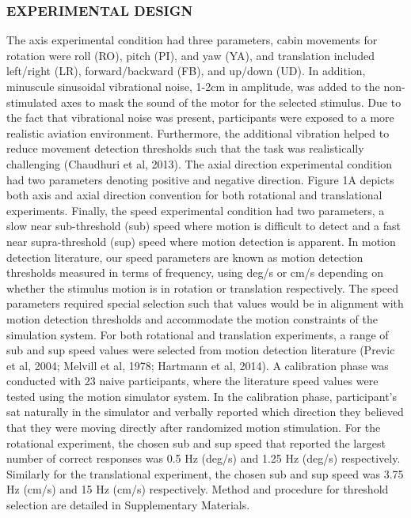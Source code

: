 \documentclass[11pt, onecolumn]{article}
\begin{document}
\subsubsection{EXPERIMENTAL DESIGN}
The axis experimental condition had three parameters, cabin movements for rotation were roll (RO), pitch (PI), and yaw (YA), and translation included left/right (LR), forward/backward (FB), and up/down (UD).  In addition, minuscule sinusoidal vibrational noise, 1-2cm in amplitude, was added to the non-stimulated axes to mask the sound of the motor for the selected stimulus.  Due to the fact that vibrational noise was present, participants were exposed to a more realistic aviation environment.  Furthermore, the additional vibration helped to reduce movement detection thresholds such that the task was realistically challenging (Chaudhuri et al, 2013).  The axial direction experimental condition had two parameters denoting positive and negative direction.  Figure 1A depicts both axis and axial direction convention for both rotational and translational experiments.  Finally, the speed experimental condition had two parameters, a slow near sub-threshold (sub) speed where motion is difficult to detect and a fast near supra-threshold (sup) speed where motion detection is apparent.  In motion detection literature, our speed parameters are known as motion detection thresholds measured in terms of frequency, using deg/s or cm/s depending on whether the stimulus motion is in rotation or translation respectively.  The speed parameters required special selection such that values would be in alignment with motion detection thresholds and accommodate the motion constraints of the simulation system.  For both rotational and translation experiments, a range of sub and sup speed values were selected from motion detection literature (Previc et al, 2004; Melvill et al, 1978; Hartmann et al, 2014).  A calibration phase was conducted with 23 naive participants, where the literature speed values were tested using the motion simulator system.  In the calibration phase, participant’s sat naturally in the simulator and verbally reported which direction they believed that they were moving directly after randomized motion stimulation.  For the rotational experiment, the chosen sub and sup speed that reported the largest number of correct responses was 0.5 Hz (deg/s) and 1.25 Hz (deg/s) respectively.  Similarly for the translational experiment, the chosen sub and sup speed was 3.75 Hz (cm/s) and 15 Hz (cm/s) respectively.  Method and procedure for threshold selection are detailed in Supplementary Materials.
\end{document}
